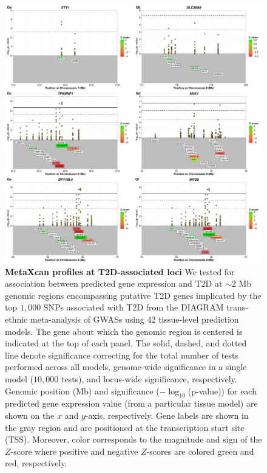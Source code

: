 \documentclass[10pt]{article}
\begin{document}
\begin{figure}
\ContinuedFloat
\includegraphics[width=\textwidth]{sup_fig1_part7_locusArray.pdf}
	\caption{\textbf{MetaXcan profiles at T2D-associated loci} We tested for association between predicted gene expression and T2D at $\sim2$ Mb genomic regions encompassing putative T2D genes implicated by the top $1,000$ SNPs associated with T2D from the DIAGRAM trans-ethnic meta-analysis of GWASs using $42$ tissue-level prediction models. The gene about which the genomic region is centered is indicated at the top of each panel. The solid, dashed, and dotted line denote significance correcting for the total number of tests performed across all models, genome-wide significance in a single model ($10,000$ tests), and locus-wide significance, respectively. Genomic position (Mb) and significance ($-\log_{10}$(p-value)) for each predicted gene expression value (from a particular tissue model) are shown on the $x$ and $y$-axis, respectively. Gene labels are shown in the gray region and are positioned at the transcription start site (TSS). Moreover, color corresponds to the magnitude and sign of the $Z$-score where positive and negative $Z$-scores are colored green and red, respectively.} 
    \label{fig:supp.locus_array_fig1_part7}
\end{figure}
\end{document}
